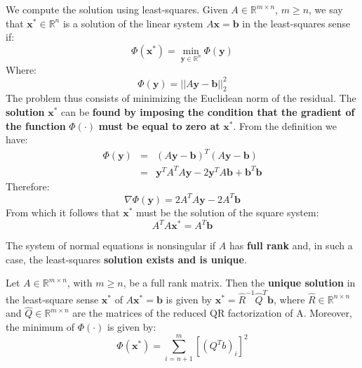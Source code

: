 \highspace
We compute the solution using least-squares. Given $A \in \mathbb{R}^{m \times n}$, $m \ge n$, we say that $\mathbf{x}^{*} \in \mathbb{R}^{n}$ is a solution of the linear system $A\mathbf{x} = \mathbf{b}$ in the least-squares sense if:
\begin{equation}
    \Phi\left(\mathbf{x}^{*}\right) = \underset{\mathbf{y} \in \mathbb{R}^{n}}{\min} \Phi\left(\mathbf{y}\right)
\end{equation}
Where:
\begin{equation}
    \Phi\left(\mathbf{y}\right) = {\left|\left|A\mathbf{y} - \mathbf{b}\right|\right|}_{2}^{2}
\end{equation}
The problem thus consists of minimizing the Euclidean norm of the residual. The \textbf{solution} $\mathbf{x}^{*}$ can be \textbf{found by imposing the condition that the gradient of the function} $\Phi\left(\cdot\right)$ \textbf{must be equal to zero at} $\mathbf{x}^{*}$. From the definition we have:
\begin{equation*}
    \begin{array}{rcl}
        \Phi\left(\mathbf{y}\right) &=& \left(A\mathbf{y} - \mathbf{b}\right)^{T}\left(A\mathbf{y} - \mathbf{b}\right) \\ [.3em]
        &=& \mathbf{y}^{T}A^{T}A\mathbf{y} - 2\mathbf{y}^{T} A \mathbf{b} + \mathbf{b}^{T}\mathbf{b}
    \end{array}
\end{equation*}
Therefore:
\begin{equation*}
    \nabla\Phi\left(\mathbf{y}\right) = 2A^{T} A \mathbf{y} - 2A^{T}\mathbf{b}
\end{equation*}
From which it follows that $\mathbf{x}^{*}$ must be the solution of the square system:
\begin{equation}
    A^{T}A\mathbf{x}^{*} = A^{T}\mathbf{b}
\end{equation}

\highspace
The system of normal equations is nonsingular if $A$ has \textbf{full rank} and, in such a case, the least-squares \textbf{solution exists and is unique}.

\begin{theorem}
    Let $A \in \mathbb{R}^{m \times n}$, with $m \ge n$, be a full rank matrix. Then the \textbf{unique solution} in the least-square sense $\mathbf{x}^{*}$ of $A\mathbf{x}^{*} = \mathbf{b}$ is given by $\mathbf{x}^{*} = \widehat{R}^{-1}\widehat{Q}^{T}\mathbf{b}$, where $\widehat{R} \in \mathbb{R}^{n \times n}$ and $\widehat{Q} \in \mathbb{R}^{m \times n}$ are the matrices of the reduced QR factorization of A. Moreover, the minimum of $\Phi\left(\cdot\right)$ is given by:
    \begin{equation*}
        \Phi\left(\mathbf{x}^{*}\right) = \displaystyle\sum_{i = n+1}^{m} \left[\left(Q^{T}b\right)_{i}\right]^{2}
    \end{equation*}
\end{theorem}

